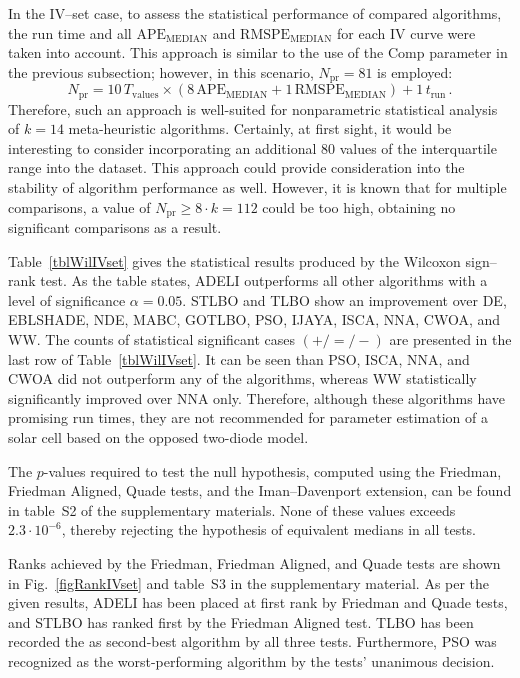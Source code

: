 \documentclass[a4paper,fleqn]{cas-dc}
\begin{document}
In the IV--set case, to assess the statistical performance of compared algorithms,
the run time and all $\mathrm{APE}_\mathrm{MEDIAN}$ and $\mathrm{RMSPE}_\mathrm{MEDIAN}$ for each IV curve were taken into account.
This approach is similar to the use of the Comp parameter in the previous subsection;
however, in this scenario, $N_\mathrm{pr}=81$ is employed:
\begin{equation*}
N_\mathrm{pr}= 10\,T_\mathrm{values}\times(8\,\mathrm{APE}_\mathrm{MEDIAN}+1\,\mathrm{RMSPE}_\mathrm{MEDIAN})+1\,t_\mathrm{run}\,.
\end{equation*}
Therefore, such an approach is well-suited for nonparametric statistical analysis of $k=14$ meta-heuristic algorithms.
Certainly, at first sight, it would be interesting to consider incorporating an additional 80 values of the interquartile range into the dataset.
This approach could provide consideration into the stability of algorithm performance as well.
However, it is known \cite{Derrac2011} that for multiple comparisons, a value of $N_\mathrm{pr}\geq 8\cdot k=112$ could be too high, obtaining
no significant comparisons as a result.

Table~\ref{tblWilIVset}  gives the statistical results produced by the Wilcoxon sign--rank test.
As the table states, ADELI outperforms all other algorithms with a level of significance $\alpha = 0.05$.
STLBO and TLBO show an improvement over
DE, EBLSHADE, NDE, MABC, GOTLBO, PSO, IJAYA, ISCA, NNA, CWOA, and WW.
The counts of statistical significant cases $(+/=/-)$ are presented in the last row of Table~\ref{tblWilIVset}.
It can be seen than PSO, ISCA, NNA, and CWOA did not outperform any of the algorithms,
whereas WW statistically significantly improved over  NNA only.
Therefore, although these algorithms have promising run times,
they are not recommended for parameter estimation of a solar cell based on the opposed two-diode model.

The $p$-values required to test the null hypothesis,
computed using the Friedman, Friedman Aligned, Quade tests, and the Iman--Davenport extension,
can be found in table~S2 of the supplementary materials.
None of these values exceeds $2.3\cdot10^{-6}$, thereby rejecting the hypothesis of equivalent medians in all tests.

Ranks achieved by the Friedman, Friedman Aligned, and Quade tests are shown in Fig.~\ref{figRankIVset} and table~S3 in the supplementary material.
As per the given results, ADELI has been placed at first rank by Friedman and Quade tests,
and STLBO has ranked first by the Friedman Aligned test.
TLBO has been recorded the as second-best algorithm by all three tests.
Furthermore, PSO was recognized as the worst-performing algorithm by the tests' unanimous decision.
\end{document}
